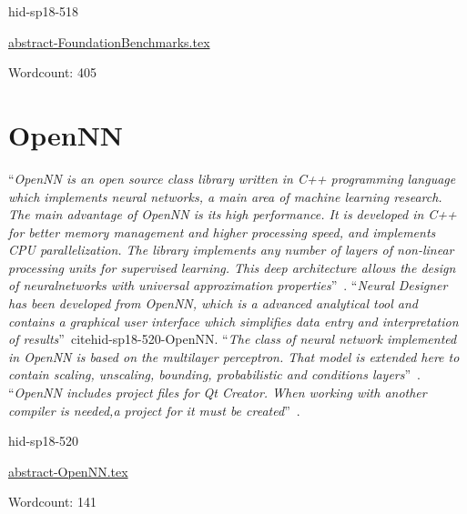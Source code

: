 \begin{IU}

hid-sp18-518

\href{https://github.com/cloudmesh-community/hid-sp18-518/blob/master//technology/abstract-FoundationBenchmarks.tex}{abstract-FoundationBenchmarks.tex}

 

Wordcount: 405

\end{IU}

\section{OpenNN}

\color{blue}``\emph{OpenNN is an open source class library written in C++ programming language
which implements neural networks, a main area of machine learning research.
The main advantage of OpenNN is its high performance. It is developed in 
C++ for better memory management and higher processing speed, and 
implements CPU parallelization. The library implements any number of layers
of non-linear processing units for supervised learning. This deep 
architecture allows the design of neuralnetworks with universal approximation
properties}''\color{black}~\cite{hid-sp18-520-OpenNN}.
\color{blue}``\emph{Neural Designer has been developed from OpenNN, which is a advanced analytical
tool and contains a graphical user interface which simplifies data entry
and interpretation of results}''\color{black}~cite{hid-sp18-520-OpenNN}.
\color{blue}``\emph{The class of neural network implemented in OpenNN is based on the multilayer 
perceptron. That model is extended here to contain scaling, unscaling, bounding,
probabilistic and conditions layers}''\color{black}~\cite{hid-sp18-520-OpenNNn}.
\color{blue}``\emph{OpenNN includes project files for Qt Creator. When working with another 
compiler is needed,a project for it must be created}''\color{black}~\cite{hid-sp18-520-OpenNNb}. 



\begin{IU}

hid-sp18-520

\href{https://github.com/cloudmesh-community/hid-sp18-520/blob/master//technology/abstract-OpenNN.tex}{abstract-OpenNN.tex}

 

Wordcount: 141

\end{IU}

